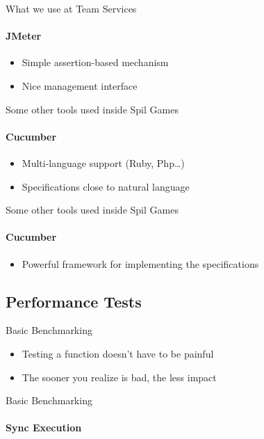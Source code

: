 \documentclass[aspectratio=169]{beamer}
\begin{document}
\begin{frame}{What we use at Team Services}
    \framesubtitle{JMeter}
    \begin{itemize}
    \item Simple assertion-based mechanism
    \item Nice management interface
    \end{itemize}
\end{frame}

\begin{frame}{Some other tools used inside Spil Games}
    \framesubtitle{Cucumber}
    \begin{itemize}
    \item Multi-language support (Ruby, Php\dots)
    \item Specifications close to natural language
        
    \end{itemize}
\end{frame}

\begin{frame}{Some other tools used inside Spil Games}
    \framesubtitle{Cucumber}
    \begin{itemize}
    \item Powerful framework for implementing the specifications
        
    \end{itemize}
\end{frame}

\subsection*{Performance Tests}
\label{performance_tests}

\begin{frame}{Basic Benchmarking}
    \begin{itemize}
    \item Testing a function doesn't have to be painful
    \item The sooner you realize is bad, the less impact
    \pause
        
    \end{itemize}
\end{frame}

\begin{frame}{Basic Benchmarking}
    \framesubtitle{Sync Execution}
    
\end{frame}
\end{document}
